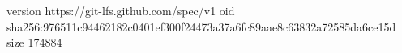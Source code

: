 version https://git-lfs.github.com/spec/v1
oid sha256:976511c94462182c0401ef300f24473a37a6fc89aae8c63832a72585da6ce15d
size 174884
